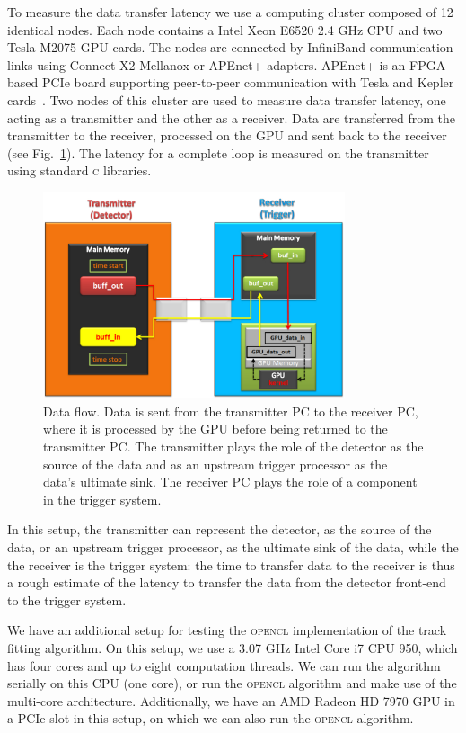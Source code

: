 \documentclass[journal]{IEEEtran}
\begin{document}
To measure the data transfer latency we use a computing cluster composed of 
12 identical nodes.  Each node contains a Intel Xeon E6520 2.4 GHz 
CPU and two Tesla M2075 GPU cards. The nodes are connected by InfiniBand 
communication links using Connect-X2 Mellanox or APEnet+ adapters. 
APEnet+ is an FPGA-based PCIe board supporting peer-to-peer communication with 
Tesla and Kepler cards~\cite{apenet2010}.
Two nodes of this cluster are used to measure data transfer latency,
one acting as a transmitter and the
other as a receiver.  Data are transferred from the transmitter to the 
receiver, processed on the GPU and sent back to the receiver (see
Fig.~\ref{fig:data_flow}).  
The latency for a complete loop is measured on the transmitter using 
standard \textsc{c} libraries.
\begin{figure}[tbp]
\centering
\includegraphics[width=3.5in]{figures/SetUp-general}
\caption{Data flow. Data is sent from the transmitter PC to the
  receiver PC, where it is processed by the GPU before being returned
  to the transmitter PC. The transmitter plays the role of the
  detector as the source of the data and as an upstream trigger
  processor as the data's ultimate sink. The receiver PC plays the
  role of a component in the trigger system. }
\label{fig:data_flow}
\end{figure}
In this setup, the transmitter can represent the detector, as
the source of the data, or an upstream trigger processor, as
the ultimate sink of the data, while the the receiver is the
trigger system: the time to transfer data to the receiver is thus a
rough estimate of the latency to transfer the data from the detector
front-end to the trigger system.

We have an additional setup for testing the \textsc{opencl} implementation of the track 
fitting algorithm. On this setup, we use a 3.07 GHz Intel Core i7 CPU 950, which has four cores 
and up to eight computation threads. We can run the algorithm serially on this CPU (one core), or 
run the \textsc{opencl} algorithm and make use of the multi-core architecture. Additionally, we have an 
AMD Radeon HD 7970 GPU in a PCIe slot in this setup, on which we can also run the \textsc{opencl} algorithm.
\end{document}
